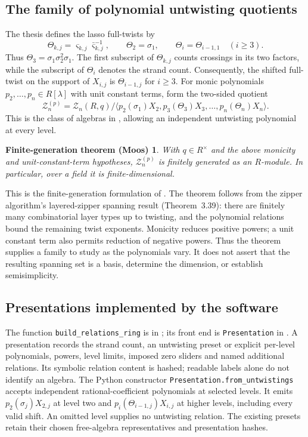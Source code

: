 \documentclass[11pt]{article}
\newtheorem*{thesistheorem}{Finite-generation theorem (Moos)}
\begin{document}
\subsection{The family of polynomial untwisting quotients}
The thesis defines the lasso full-twists by
\[
 \Theta_{k,j}=\varsigma_{k,j}\bar{\varsigma}_{k,j}^{-1},\qquad
 \Theta_2=\sigma_1,\qquad \Theta_i=\Theta_{i-1,1}\quad(i\ge3).
\]
Thus $\Theta_3=\sigma_1\sigma_2^2\sigma_1$. The first subscript of
$\Theta_{k,j}$ counts crossings in its two factors, while the subscript of
$\Theta_i$ denotes the strand count. Consequently, the shifted full-twist on
the support of $X_{i,j}$ is $\Theta_{i-1,j}$ for $i\ge3$.
For monic polynomials $p_2,\ldots,p_n\in R[\lambda]$ with unit constant terms,
form the two-sided quotient
\[
 \mathcal Z_n^{(p)}=
 \mathcal Z_n(R,q)/\langle p_2(\sigma_1)X_2,
                  p_3(\Theta_3)X_3,\ldots,p_n(\Theta_n)X_n\rangle.
\]
This is the class of algebras in \cite[Definition~2.9]{thesis}, allowing an
independent untwisting polynomial at every level.

\begin{thesistheorem}
With $q\in R^\times$ and the above monicity and unit-constant-term hypotheses,
$\mathcal Z_n^{(p)}$ is finitely generated as an $R$-module. In particular,
over a field it is finite-dimensional.
\end{thesistheorem}
This is the finite-generation formulation of \cite[Theorem~3.41, p.~62]{thesis}.
The theorem follows from the zipper algorithm's layered-zipper spanning result
(Theorem~3.39): there are finitely many combinatorial layer types up to twisting,
and the polynomial relations bound the remaining twist exponents. Monicity
reduces positive powers; a unit constant term also permits reduction of
negative powers. Thus the theorem supplies a family to study as the polynomials
vary. It does not assert that the resulting spanning set is a basis, determine
the dimension, or establish semisimplicity.

\subsection{Presentations implemented by the software}
The function \texttt{build\_relations\_ring} is in
; its front end is
\texttt{Presentation} in .
A presentation records the strand count, an untwisting preset or explicit
per-level polynomials, powers, level limits, imposed zero sliders and named
additional relations. Its symbolic relation content is hashed; readable labels
alone do not identify an algebra. The Python constructor
\texttt{Presentation.from\_untwistings} accepts independent rational-coefficient
polynomials at selected levels. It emits $p_2(\sigma_j)X_{2,j}$ at level two and
$p_i(\Theta_{i-1,j})X_{i,j}$ at higher levels, including every valid shift.
An omitted level supplies no untwisting relation. The existing presets retain
their chosen free-algebra representatives and presentation hashes.
\end{document}
